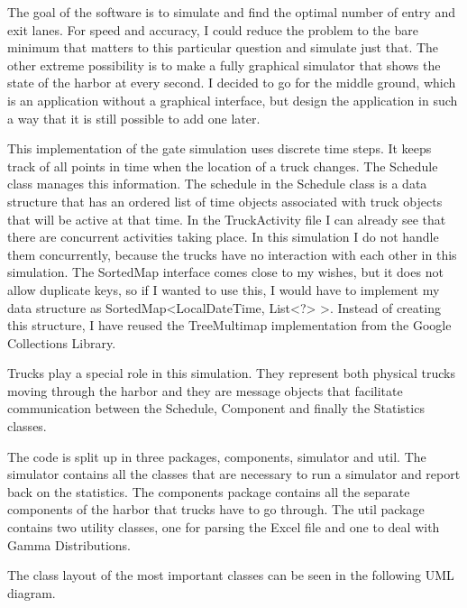 \documentclass{article}
\begin{document}
The goal of the software is to simulate and find the optimal number of
entry and exit lanes. For speed and accuracy, I could reduce the
problem to the bare minimum that matters to this particular question
and simulate just that. The other extreme possibility is to make a
fully graphical simulator that shows the state of the harbor at every
second. I decided to go for the middle ground, which is an application
without a graphical interface, but design the application in such a
way that it is still possible to add one later.

This implementation of the gate simulation uses discrete time
steps. It keeps track of all points in time when the location of a
truck changes. The Schedule class manages this information. The
schedule in the Schedule class is a data structure that has an ordered
list of time objects associated with truck objects that will be active
at that time. In the TruckActivity file I can already see that there
are concurrent activities taking place. In this simulation I do not
handle them concurrently, because the trucks have no interaction with
each other in this simulation. The SortedMap interface comes close to
my wishes, but it does not allow duplicate keys, so if I wanted to use
this, I would have to implement my data structure as
SortedMap\textless LocalDateTime, List\textless ?\textgreater
\textgreater. Instead of creating this structure, I have reused the
TreeMultimap implementation from the Google Collections Library.

Trucks play a special role in this simulation. They represent both
physical trucks moving through the harbor and they are message objects
that facilitate communication between the Schedule, Component and
finally the Statistics classes.

The code is split up in three packages, components, simulator and
util. The simulator contains all the classes that are necessary to run
a simulator and report back on the statistics. The components package
contains all the separate components of the harbor that trucks have to
go through. The util package contains two utility classes, one for
parsing the Excel file and one to deal with Gamma Distributions.

The class layout of the most important classes can be seen in the
following UML diagram.
\end{document}
